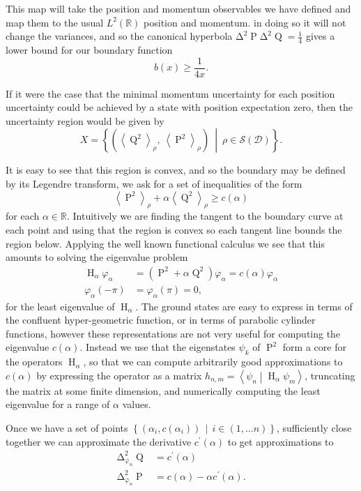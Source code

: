 \documentclass[prb,amsmath,amssymb,notitlepage]{revtex4-1}
\newcommand{\var}[2]{\operatorname{\Delta^{\!2}_{{#2}}} #1}
\newcommand{\expr}[1]{\left\langle #1\right\rangle_\rho} %
\newcommand{\braket}[2]{\left\langle #1 \middle| #2 \right\rangle}
\newcommand{\dop}[1]{\mathcal{S}\left(#1\right)}
\DeclareMathOperator{\opp}{P}
\DeclareMathOperator{\opq}{Q}
\DeclareMathOperator{\oph}{H}
\begin{document}
This map will take the position and momentum observables we have defined and map them to the usual $L^2\left(\mathbb{R}\right)$ position and momentum. in doing so it will not change the variances, and so the canonical hyperbola $\var{\opp}{}\var{\opq}{} = \frac{1}{4}$ gives a lower bound for our boundary function 
\begin{equation}
	\label{eqn:can-hyp}
	b(x) \geq \frac{1}{4 x}.
\end{equation}

If it were the case that the minimal momentum uncertainty for each position uncertainty could be achieved by a state with position expectation zero, then the uncertainty region would be given by
\begin{equation}
	X = \left\{\left(\expr{\opq^2},\ \expr{\opp^2}\right)\ \middle |\ \rho \in \dop{\mathcal{D}}\right\}.
\end{equation}

It is easy to see that this region is convex, and so the boundary may be defined by its Legendre transform, we ask for a set of inequalities of the form
\begin{equation}
	\expr{\opp^2} + \alpha \expr{\opq^2} \geq c(\alpha)
\end{equation}
for each $\alpha\in\mathbb{R}$. Intuitively we are finding the tangent to the boundary curve at each point and using that the region is convex so each tangent line bounds the region below. Applying the well known functional calculus we see that this amounts to solving the eigenvalue problem
\begin{align}
	\oph_\alpha \varphi_\alpha &= \left(\opp^2 + \alpha \opq^2\right)\varphi_\alpha = c(\alpha) \varphi_\alpha\\
	\varphi_\alpha(-\pi) &=\varphi_\alpha(\pi) = 0,
\end{align}
for the least eigenvalue of $\oph_\alpha$. The ground states are easy to express in terms of the confluent hyper-geometric function, or in terms of parabolic cylinder functions, however these representations are not very useful for computing the eigenvalue $c(\alpha)$. Instead we use that the eigenstates $\psi_k$ of $\opp^2$ form a core for the operators $\oph_\alpha$, so that we can compute arbitrarily good approximations to $c(\alpha)$ by expressing the operator as a matrix $h_{n,m} = \braket{\psi_n}{\oph_\alpha\psi_m}$, truncating the matrix at some finite dimension, and numerically computing the least eigenvalue for a range of $\alpha$ values.

Once we have a set of points $\left\{\left(\alpha_i, c(\alpha_i)\right)\,\middle|\, i\in(1, \ldots n)\right\}$, sufficiently close together we can approximate the derivative $c^\prime(\alpha)$ to get approximations to
\begin{align}
	\label{eqn:pos-exp-0-x}
	\var{\opq}{\varphi_\alpha} &= c^\prime(\alpha)\\
	\label{eqn:pos-exp-0-y}
	\var{\opp}{\varphi_\alpha} &= c(\alpha) - \alpha c^\prime(\alpha).
\end{align}
\end{document}
